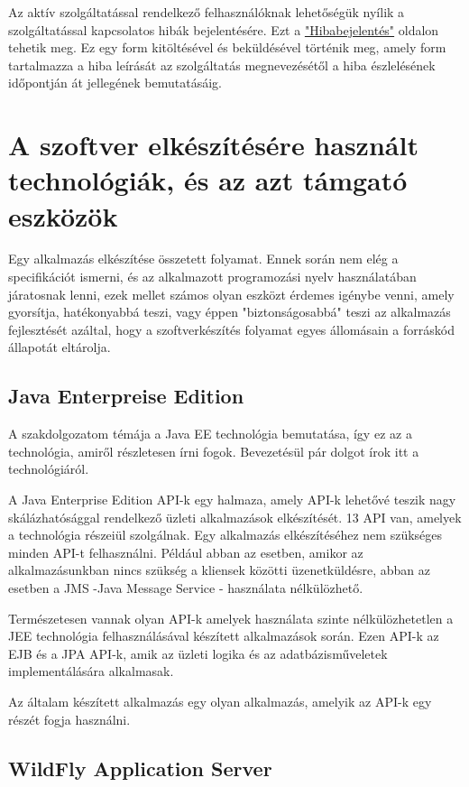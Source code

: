 \documentclass[centeredchapter]{thesis-ekf}
\theoremstyle{definition}
\theoremstyle{remark}
\begin{document}
Az aktív szolgáltatással rendelkező felhasználóknak lehetőségük nyílik a szolgáltatással kapcsolatos hibák bejelentésére. Ezt a \hyperlink{leiras-bejelentes}{"Hibabejelentés"} oldalon tehetik meg.
Ez egy form kitöltésével és beküldésével történik meg, amely form tartalmazza a hiba leírását az szolgáltatás megnevezésétől a hiba észlelésének időpontján át jellegének bemutatásáig.

\section{A szoftver elkészítésére használt technológiák, és az azt támgató eszközök}

Egy alkalmazás elkészítése összetett folyamat. Ennek során nem elég a specifikációt ismerni, és az alkalmazott programozási nyelv használatában járatosnak lenni, ezek mellet számos olyan eszközt érdemes igénybe venni, amely gyorsítja, hatékonyabbá teszi, vagy éppen "biztonságosabbá" teszi az alkalmazás fejlesztését azáltal, hogy a szoftverkészítés folyamat egyes állomásain a forráskód állapotát eltárolja.

\subsection{Java Enterpreise Edition}

A szakdolgozatom témája a Java EE technológia bemutatása, így ez az a technológia, amiről részletesen írni fogok. Bevezetésül pár dolgot írok itt a technológiáról.

A Java Enterprise Edition API-k egy halmaza, amely API-k lehetővé teszik nagy skálázhatósággal rendelkező üzleti alkalmazások elkészítését. 13 API van, amelyek a technológia részeiül szolgálnak.
Egy alkalmazás elkészítéséhez nem szükséges minden API-t felhasználni. Például abban az esetben, amikor az alkalmazásunkban nincs szükség a kliensek közötti üzenetküldésre, abban az esetben a JMS -Java Message Service - használata nélkülözhető.

Természetesen vannak olyan API-k amelyek használata szinte nélkülözhetetlen a JEE technológia felhasználásával készített alkalmazások során. Ezen API-k az EJB és a JPA API-k, amik az üzleti logika és az adatbázisműveletek implementálására alkalmasak.

Az általam készített alkalmazás egy olyan alkalmazás, amelyik az API-k egy részét fogja használni.

\subsection{WildFly Application Server}
\end{document}

